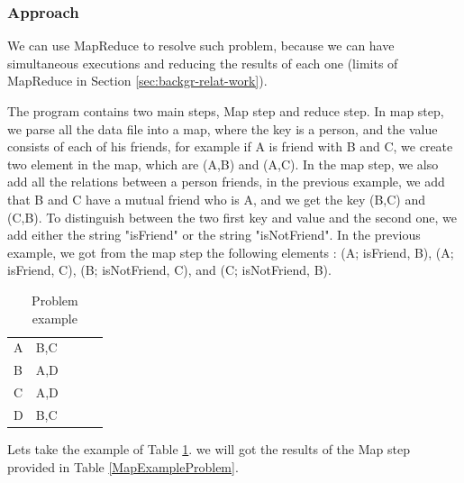 \documentclass[10pt, conference]{IEEEtran}
\begin{document}
\subsubsection{Approach}
We can use MapReduce to resolve such problem, because we can have simultaneous executions and reducing the results of each one (limits of MapReduce in Section \ref{sec:backgr-relat-work}).


The program contains two main steps, Map step and reduce step. In map step, we parse all the data file into a map, where the key is a person, and the value consists of each of his friends, for example if A is friend with B and C, we create two element in the map, which are (A,B) and (A,C). In the map step, we also add all the relations between a person friends, in the previous example, we add that B and C have a mutual friend who is A, and we get the key (B,C) and (C,B). To distinguish between the two first key and value and the second one, we add either the string "isFriend" or the string "isNotFriend". In the previous example, we got from the map step the following elements : (A; isFriend, B), (A; isFriend, C), (B; isNotFriend, C), and (C; isNotFriend, B).




\begin{center}
\begin{table}
\begin{center}
\begin{tabular}{|l|l|l|l|l|}
  \hline
 A & B,C \\
 B & A,D \\
 C & A,D \\
 D & B,C \\
  \hline
\end{tabular}

\caption{\label{ExampleProblem} Problem example  }
\end{center}
\end{table}
\end{center}

Lets take the example of Table \ref{ExampleProblem}. we will got the results of the Map step provided in Table \ref{MapExampleProblem}.
\end{document}
